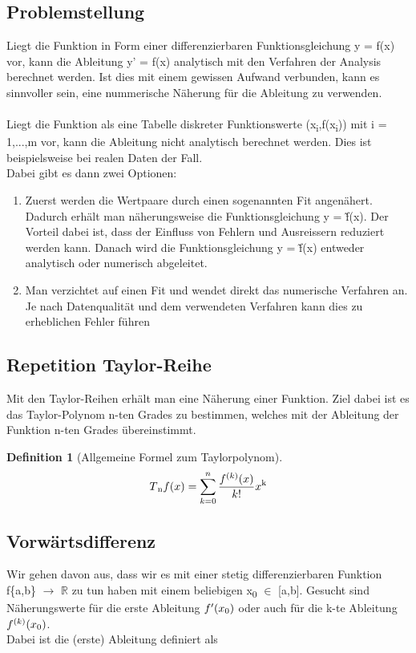 \documentclass{article}
\theoremstyle{satz}
\theoremstyle{definition}
\newtheorem{definition}{Definition}
\begin{document}
\subsection{Problemstellung}
Liegt die Funktion in Form einer differenzierbaren Funktionsgleichung y = f(x) vor, kann die Ableitung y' = f(x) analytisch mit den Verfahren der Analysis berechnet werden. Ist dies mit einem gewissen Aufwand verbunden, kann es sinnvoller sein, eine nummerische Näherung für die Ableitung zu verwenden. \\ \\Liegt die Funktion als eine Tabelle diskreter Funktionswerte (x\textsubscript{i},f(x\textsubscript{i})) mit i = 1,...,m vor, kann die Ableitung nicht analytisch berechnet werden. Dies ist beispielsweise bei realen Daten der Fall.\\ Dabei gibt es dann zwei Optionen:
	\begin{enumerate}
		\item{Zuerst werden die Wertpaare durch einen sogenannten Fit angenähert. Dadurch erhält man 		näherungsweise die Funktionsgleichung y = \~f(x). Der Vorteil dabei ist, dass der Einfluss von Fehlern und Ausreissern reduziert werden kann.  Danach wird die Funktionsgleichung y = \~f(x) entweder analytisch oder numerisch abgeleitet.}
		\item{Man verzichtet auf einen Fit und wendet direkt das numerische Verfahren an. Je nach Datenqualität und dem verwendeten Verfahren kann dies zu erheblichen Fehler führen}
	\end{enumerate}

\subsection{Repetition Taylor-Reihe}
Mit den Taylor-Reihen erhält man eine Näherung einer Funktion. Ziel dabei ist es das Taylor-Polynom n-ten Grades zu bestimmen, welches mit der Ableitung der Funktion n-ten Grades übereinstimmt. 
	\theoremstyle{definition}
	\begin{definition}[Allgemeine Formel zum Taylorpolynom]
		\begin{equation}
			T\textsubscript{n}f(x) = \sum\limits_{k=0}^{n} \frac{f^{(k)}(x)}{k!}x\textsuperscript{k}
		\end{equation}
	\end{definition}

\subsection{Vorwärtsdifferenz}
Wir gehen davon aus, dass wir es mit einer stetig differenzierbaren Funktion f\{a,b\} $\rightarrow$ $\mathbb{R}$ zu tun haben mit einem beliebigen x\textsubscript{0} $\in$ [a,b]. 
Gesucht sind Näherungswerte für die erste Ableitung $f'(x\textsubscript{0})$ oder auch für die k-te Ableitung $f^{(k)}(x\textsubscript{0})$. \\Dabei ist die (erste) 
Ableitung definiert als
\end{document}
